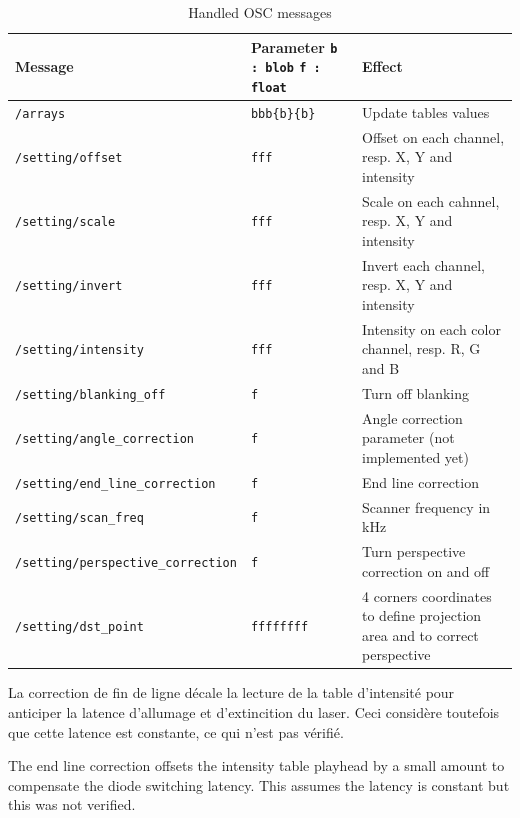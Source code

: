 \begin{en}
\begin{table}
\begin{bigcenter}
	\begin{tabular}{|l|p{2cm}|p{}|}
\hline 
\textbf{Message} & \textbf{Parameter} \texttt{b : blob} \texttt{f : float} & \textbf{Effect} \\
\hline 
\texttt{/arrays} & \texttt{bbb\{b\}\{b\}} & Update tables values \\ 
\hline 
\texttt{/setting/offset} & \texttt{fff} & Offset on each channel, resp. X, Y and intensity \\ 
\hline 
\texttt{/setting/scale} & \texttt{fff} & Scale on each cahnnel, resp. X, Y and intensity \\ 
\hline 
\texttt{/setting/invert} & \texttt{fff} & Invert each channel, resp. X, Y and intensity \\ 
\hline 
\texttt{/setting/intensity} & \texttt{fff} & Intensity on each color channel, resp. R, G and B \\  
\hline
\texttt{/setting/blanking\_off} & \texttt{f} & Turn off blanking \\
\hline
\texttt{/setting/angle\_correction} & \texttt{f} & Angle correction parameter (not implemented yet) \\
\hline
\texttt{/setting/end\_line\_correction} & \texttt{f} & End line correction \\
\hline
\texttt{/setting/scan\_freq} & \texttt{f} & Scanner frequency in \unit{kHz} \\
\hline
\texttt{/setting/perspective\_correction} & \texttt{f} & Turn perspective correction on and off \\
\hline
\texttt{/setting/dst\_point} & \texttt{ffffffff} & 4 corners coordinates to define projection area and to correct perspective \\
\hline
	\end{tabular}
	\end{bigcenter}
	\caption{\label{tab:message_osc} Handled OSC messages}
\end{table}
\end{en}

\begin{fr}
La correction de fin de ligne décale la lecture de la table d'intensité pour anticiper la latence d'allumage et d'extincition du laser.
Ceci considère toutefois que cette latence est constante, ce qui n'est pas vérifié.
\end{fr}

\begin{en}
The end line correction offsets the intensity table playhead by a small amount to compensate the diode switching latency.
This assumes the latency is constant but this was not verified.
\end{en}

